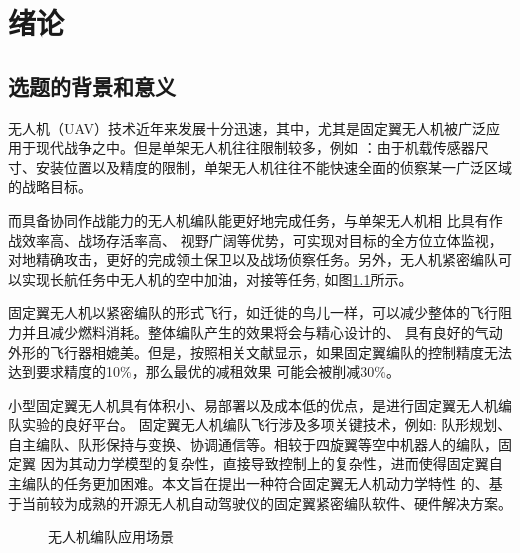 %
%
%
%

\chapter{绪论}
\label{chap:intro}
\section{选题的背景和意义}
无人机（UAV）技术近年来发展十分迅速，其中，尤其是固定翼无人机被广泛应用于现代战争之中。但是单架无人机往往限制较多，例如
：由于机载传感器尺寸、安装位置以及精度的限制，单架无人机往往不能快速全面的侦察某一广泛区域的战略目标。

而具备协同作战能力的无人机编队能更好地完成任务，与单架无人机相 比具有作战效率高、战场存活率高、
视野广阔等优势，可实现对目标的全方位立体监视，对地精确攻击，更好的完成领土保卫以及战场侦察任务。另外，无人机紧密编队可
以实现长航任务中无人机的空中加油，对接等任务, 如图\ref{fig:c01-meaning}所示。

固定翼无人机以紧密编队的形式飞行，如迁徙的鸟儿一样，可以减少整体的飞行阻力并且减少燃料消耗。整体编队产生的效果将会与精心设计的、
具有良好的气动外形的飞行器相媲美。但是，按照相关文献显示，如果固定翼编队的控制精度无法达到要求精度的10\%，那么最优的减租效果
可能会被削减30\%。\cite{Zhang2017Aerodynamics}

小型固定翼无人机具有体积小、易部署以及成本低的优点，是进行固定翼无人机编队实验的良好平台。
固定翼无人机编队飞行涉及多项关键技术，例如: 队形规划、自主编队、队形保持与变换、协调通信等。相较于四旋翼等空中机器人的编队，固定翼
因为其动力学模型的复杂性，直接导致控制上的复杂性，进而使得固定翼自主编队的任务更加困难。本文旨在提出一种符合固定翼无人机动力学特性
的、基于当前较为成熟的开源无人机自动驾驶仪的固定翼紧密编队软件、硬件解决方案。
 \begin{figure}[H]
  \centering
  \caption{无人机编队应用场景}
  \label{fig:c01-meaning}
  \end{figure}
